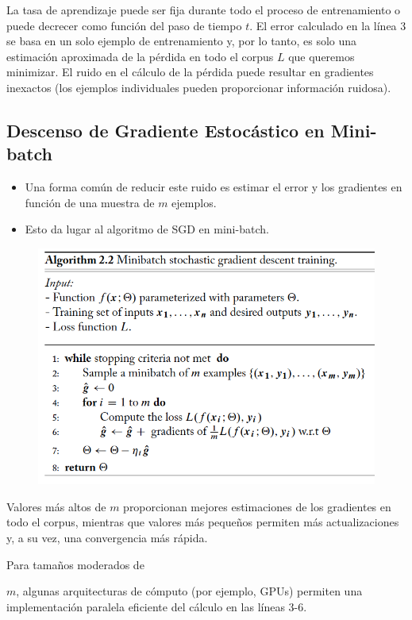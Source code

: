 La tasa de aprendizaje puede ser fija durante todo el proceso de entrenamiento o puede decrecer como función del paso de tiempo $t$. El error calculado en la línea 3 se basa en un solo ejemplo de entrenamiento y, por lo tanto, es solo una estimación aproximada de la pérdida en todo el corpus $L$ que queremos minimizar. El ruido en el cálculo de la pérdida puede resultar en gradientes inexactos (los ejemplos individuales pueden proporcionar información ruidosa).

\subsection{Descenso de Gradiente Estocástico en Mini-batch}
\begin{itemize}
\item Una forma común de reducir este ruido es estimar el error y los gradientes en función de una muestra de $m$ ejemplos.
\item Esto da lugar al algoritmo de SGD en mini-batch.
\end{itemize}

\begin{figure}[htb]
	\centering
	 \includegraphics[scale=0.25]{pics/minibatch-SGD.png}
\end{figure}

Valores más altos de $m$ proporcionan mejores estimaciones de los gradientes en todo el corpus, mientras que valores más pequeños permiten más actualizaciones y, a su vez, una convergencia más rápida.

Para tamaños moderados de

$m$, algunas arquitecturas de cómputo (por ejemplo, GPUs) permiten una implementación paralela eficiente del cálculo en las líneas 3-6.

